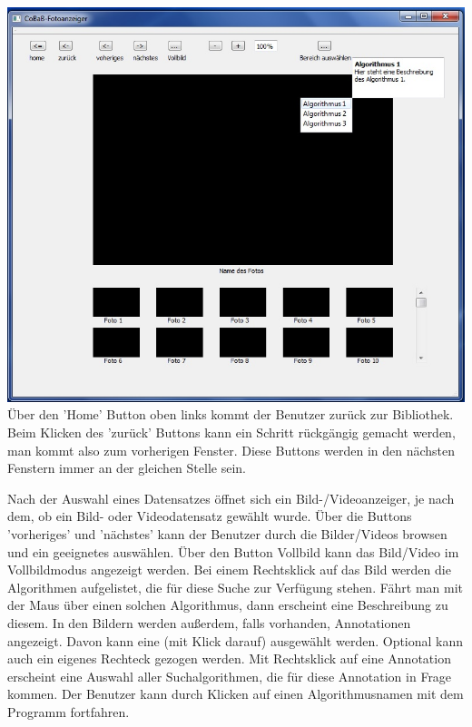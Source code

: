 \includegraphics[width=1\linewidth]{img/Fotoanzeiger}
Über den 'Home' Button oben links kommt der Benutzer zurück zur Bibliothek. Beim Klicken des 'zurück' Buttons kann ein Schritt rückgängig gemacht werden, man kommt also zum vorherigen Fenster. Diese Buttons werden in den nächsten Fenstern immer an der gleichen Stelle sein.

Nach der Auswahl eines Datensatzes öffnet sich ein Bild-/Videoanzeiger, je nach dem, ob ein Bild- oder Videodatensatz gewählt wurde. Über die Buttons 'vorheriges' und 'nächstes' kann der Benutzer durch die Bilder/Videos browsen und ein geeignetes auswählen. Über den Button Vollbild kann das Bild/Video im Vollbildmodus angezeigt werden.
Bei einem Rechtsklick auf das Bild werden die Algorithmen aufgelistet, die für diese Suche zur Verfügung stehen. Fährt man mit der Maus über einen solchen Algorithmus, dann erscheint eine Beschreibung zu diesem.
In den Bildern werden außerdem, falls vorhanden, Annotationen angezeigt. Davon kann eine (mit Klick darauf) ausgewählt werden. Optional kann auch ein eigenes Rechteck gezogen werden. Mit Rechtsklick auf eine Annotation erscheint eine Auswahl aller Suchalgorithmen, die für diese Annotation in Frage kommen. Der Benutzer kann durch Klicken auf einen Algorithmusnamen mit dem Programm fortfahren.

